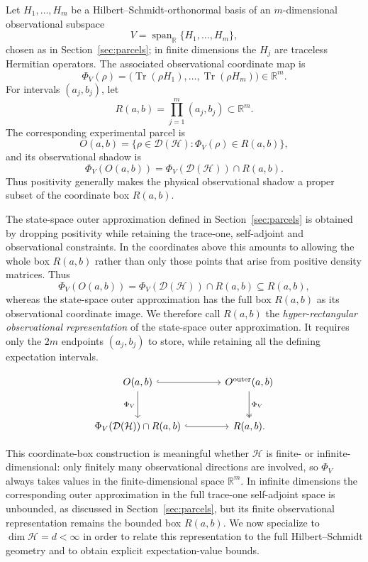 \documentclass[11pt, onecolumn]{article}
\begin{document}
Let $H_1,\ldots,H_m$ be a Hilbert--Schmidt-orthonormal basis of an
$m$-dimensional observational subspace
\[
V=\operatorname{span}_{\mathbb R}\{H_1,\ldots,H_m\},
\]
chosen as in Section~\ref{sec:parcels}; in finite dimensions the $H_j$
are traceless Hermitian operators. The associated observational
coordinate map is
\[
\Phi_V(\rho)
=
\bigl(
\operatorname{Tr}(\rho H_1),\ldots,
\operatorname{Tr}(\rho H_m)
\bigr)
\in\mathbb R^m.
\]
For intervals $(a_j,b_j)$, let
\[
R(a,b)
=
\prod_{j=1}^m(a_j,b_j)
\subset\mathbb R^m.
\]
The corresponding experimental parcel is
\[
O(a,b)
=
\{\rho\in\mathcal D(\mathcal H):
\Phi_V(\rho)\in R(a,b)\},
\]
and its observational shadow is
\[
\Phi_V(O(a,b))
=
\Phi_V(\mathcal D(\mathcal H))\cap R(a,b).
\]
Thus positivity generally makes the physical observational shadow a
proper subset of the coordinate box $R(a,b)$.

The state-space outer approximation defined in
Section~\ref{sec:parcels} is obtained by dropping positivity while
retaining the trace-one, self-adjoint and observational constraints.
In the coordinates above this amounts to allowing the whole box
$R(a,b)$ rather than only those points that arise from positive density
matrices. Thus
\[
\Phi_V(O(a,b))
=
\Phi_V(\mathcal D(\mathcal H))\cap R(a,b)
\subseteq R(a,b),
\]
whereas the state-space outer approximation has the full box $R(a,b)$
as its observational coordinate image. We therefore call $R(a,b)$ the
\emph{hyper-rectangular observational representation} of the
state-space outer approximation. It requires only the $2m$ endpoints
$(a_j,b_j)$ to store, while retaining all the defining expectation
intervals.

\[
\begin{tikzcd}[column sep=large,row sep=large]
O(a,b)
    \arrow[r, hook]
    \arrow[d, "\Phi_V"']
&
O^{\mathrm{outer}}(a,b)
    \arrow[d, two heads, "\Phi_V"]
\\
\Phi_V(\mathcal D(\mathcal H))\cap R(a,b)
    \arrow[r, hook]
&
R(a,b).
\end{tikzcd}
\]

This coordinate-box construction is meaningful whether $\mathcal H$ is
finite- or infinite-dimensional: only finitely many observational
directions are involved, so $\Phi_V$ always takes values in the
finite-dimensional space $\mathbb R^m$. In infinite dimensions the
corresponding outer approximation in the full trace-one self-adjoint
space is unbounded, as discussed in Section~\ref{sec:parcels}, but its
finite observational representation remains the bounded box $R(a,b)$.
We now specialize to $\dim\mathcal H=d<\infty$ in order to relate this
representation to the full Hilbert--Schmidt geometry and to obtain
explicit expectation-value bounds.
\end{document}
